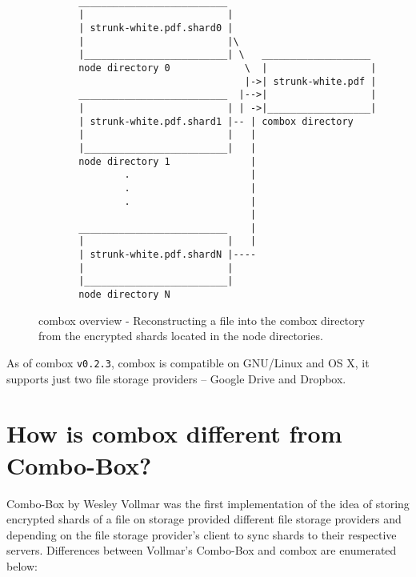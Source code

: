 \begin{figure}[h]
\begin{verbatim}

       __________________________
       |                         |
       | strunk-white.pdf.shard0 |
       |                         |\
       |_________________________| \   ___________________
       node directory 0             \  |                  |
                                    |->| strunk-white.pdf |
       __________________________  |-->|                  |
       |                         | | ->|__________________|
       | strunk-white.pdf.shard1 |-- | combox directory
       |                         |   |
       |_________________________|   |
       node directory 1              |
               .                     |
               .                     |
               .                     |
                                     |
       __________________________    |
       |                         |   |
       | strunk-white.pdf.shardN |----
       |                         |
       |_________________________|
       node directory N

\end{verbatim}
  \caption{combox overview - Reconstructing a file into the combox
    directory from the encrypted shards located in the node
    directories.}
\label{fig:1-combox-overview-1}
\end{figure}

As of combox \verb+v0.2.3+, combox is compatible on GNU/Linux and OS
X, it supports just two file storage providers -- Google Drive and
Dropbox.

\section{How is combox different from Combo-Box?}\label{1-sec-cb-diff}

Combo-Box by Wesley Vollmar\cite{vollmar-combo-box} was the first
implementation of the idea of storing encrypted shards of a file on
storage provided different file storage providers and depending on the
file storage provider's client to sync shards to their respective
servers. Differences between Vollmar's Combo-Box and combox are
enumerated below:

